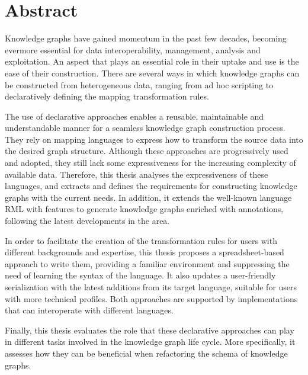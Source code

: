 %

\section*{Abstract}
\label{sec::abstract}




Knowledge graphs have gained momentum in the past few decades, becoming evermore essential for data interoperability, management, analysis and exploitation. 
An aspect that plays an essential role in their uptake and use is the ease of their construction. 
There are several ways in which knowledge graphs can be constructed from heterogeneous data, ranging from ad hoc scripting to declaratively defining the mapping transformation rules.

The use of declarative approaches enables a reusable, maintainable and understandable manner for a seamless knowledge graph construction process.
They rely on mapping languages to express how to transform the source data into the desired graph structure. 
Although these approaches are progressively used and adopted, they still lack some expressiveness for the increasing complexity of available data. 
Therefore, this thesis analyses the expressiveness of these languages, and extracts and defines the requirements for constructing knowledge graphs with the current needs. 
In addition, it extends the well-known language RML with features to generate knowledge graphs enriched with annotations, following the latest developments in the area.

In order to facilitate the creation of the transformation rules for users with different backgrounds and expertise, this thesis proposes a spreadsheet-based approach to write them, providing a familiar environment and suppressing the need of learning the syntax of the language.
It also updates a user-friendly serialization with the latest additions from its target language, suitable for users with more technical profiles. 
Both approaches are supported by implementations that can interoperate with different languages. 

Finally, this thesis evaluates the role that these declarative approaches can play in different tasks involved in the knowledge graph life cycle. 
More specifically, it assesses how they can be beneficial when refactoring the schema of knowledge graphs. 

